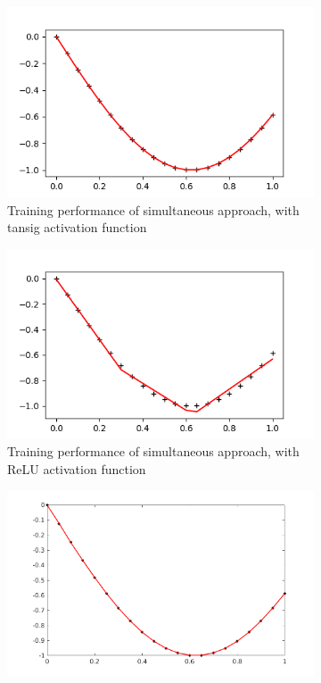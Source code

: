\begin{figure}
     \centering
     \begin{subfigure}[b]{0.8\textwidth}
         \centering
         \includegraphics[width=\textwidth]{alm-tanh}
         \caption{Training performance of simultaneous approach, with tansig activation function}
         \label{alm-tanh}
     \end{subfigure}
     \begin{subfigure}[b]{0.8\textwidth}
         \centering
         \includegraphics[width=\textwidth]{alm-relu}
         \caption{Training performance of simultaneous approach, with ReLU activation function}
         \label{alm-relu}
     \end{subfigure}
     \begin{subfigure}[b]{0.8\textwidth}
         \centering
         \includegraphics[width=\textwidth]{back-relu}

\end{subfigure}
\end{figure}
